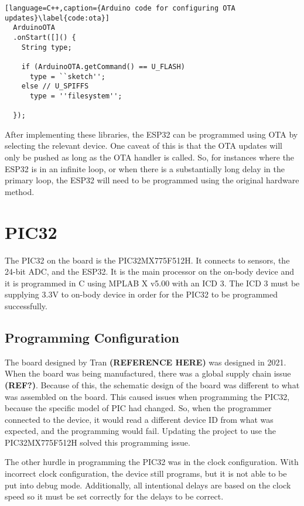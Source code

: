 \begin{lstlisting}[language=C++,caption={Arduino code for configuring OTA updates}\label{code:ota}]
  ArduinoOTA
  .onStart([]() {
    String type;

    if (ArduinoOTA.getCommand() == U_FLASH)
      type = ``sketch'';
    else // U_SPIFFS
      type = ''filesystem'';

  });

\end{lstlisting}

After implementing these libraries, the ESP32 can be programmed using OTA by selecting the relevant device.
One caveat of this is that the OTA updates will only be pushed as long as the OTA handler is called.
So, for instances where the ESP32 is in an infinite loop, or when there is a substantially long delay in the primary loop,
the ESP32 will need to be programmed using the original hardware method.


\section{PIC32}
The PIC32 on the board is the PIC32MX775F512H.
It connects to sensors, the 24-bit ADC, and the ESP32.
It is the main processor on the on-body device and it is programmed in C using MPLAB X v5.00 with an ICD 3.
The ICD 3 must be supplying 3.3V to on-body device in order for the PIC32 to be programmed successfully.

\subsection{Programming Configuration}
The board designed by Tran \textbf{(REFERENCE HERE)} was designed in 2021.
When the board was being manufactured, there was a global supply chain issue \textbf{(REF?)}.
Because of this, the schematic design of the board was different to what was assembled on the board.
This caused issues when programming the PIC32, because the specific model of PIC had changed.
So, when the programmer connected to the device, it would read a different device ID from what was expected,
and the programming would fail.
Updating the project to use the PIC32MX775F512H solved this programming issue.

The other hurdle in programming the PIC32 was in the clock configuration.
With incorrect clock configuration, the device still programs, but it is not able to be put into debug mode.
Additionally, all intentional delays are based on the clock speed so it must be set correctly for the delays to be correct.

